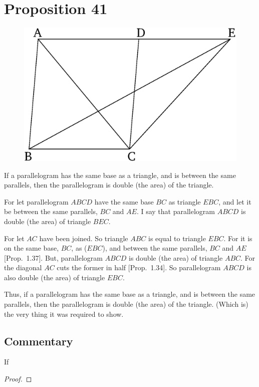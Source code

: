 \chapter*{Proposition 41}



\begin{figure}[ht]
    \begin{center}
    \includegraphics[width=0.5\linewidth]{figures/fig41e.eps}
    \label{fig:prop_41}
    \end{center}
\end{figure}

If a parallelogram has the same base as a triangle, and is between
the same parallels, then the parallelogram is double (the area) of the triangle.

For let parallelogram $ABCD$ have the same base $BC$ as triangle $EBC$,
and let it be between the same parallels, $BC$ and $AE$. I say that 
parallelogram $ABCD$ is double (the area) of triangle $BEC$.

For let $AC$ have been joined. So triangle $ABC$ is equal to triangle
$EBC$. For it is on the same base, $BC$,  as ($EBC$), and between the same
parallels, $BC$ and $AE$ [Prop.~1.37]. But, parallelogram $ABCD$
is double (the area) of triangle $ABC$. For the diagonal $AC$ cuts
the former in half [Prop.~1.34]. So parallelogram $ABCD$ is also
double (the area) of triangle $EBC$.

Thus, if a parallelogram has the same base as a triangle, and is between
the same parallels, then the parallelogram is double (the area) of the triangle.
(Which is) the very thing it was required to show.


\section*{Commentary}

\begin{proposition}\label{proposition_41}\leanok
    If
\end{proposition}
\begin{proof}
    \leanok
\end{proof}
